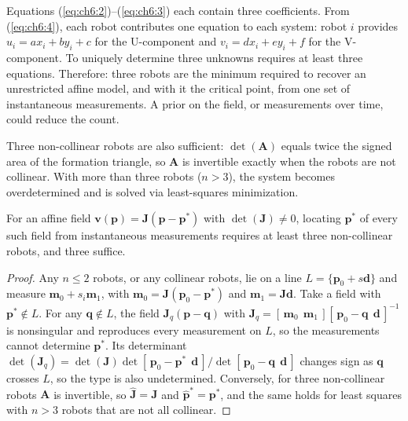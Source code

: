 Equations (\ref{eq:ch6:2})--(\ref{eq:ch6:3}) each contain three coefficients. From (\ref{eq:ch6:4}), each robot contributes one equation to each system: robot $i$ provides $u_i = ax_i + by_i + c$ for the U-component and $v_i = dx_i + ey_i + f$ for the V-component. To uniquely determine three unknowns requires at least three equations. Therefore: three robots are the minimum required to recover an unrestricted affine model, and with it the critical point, from one set of instantaneous measurements. A prior on the field, or measurements over time, could reduce the count.


Three non-collinear robots are also sufficient: $\det(\mathbf{A})$ equals twice the signed area of the formation triangle, so $\mathbf{A}$ is invertible exactly when the robots are not collinear. With more than three robots ($n > 3$), the system becomes overdetermined and is solved via least-squares minimization.

\begin{proposition}[Minimality]\label{prop:min}
For an affine field $\mathbf{v}(\mathbf{p}) = \mathbf{J}(\mathbf{p}-\mathbf{p}^*)$ with $\det(\mathbf{J}) \neq 0$, locating $\mathbf{p}^*$ of every such field from instantaneous measurements requires at least three non-collinear robots, and three suffice.
\end{proposition}

\begin{proof}
Any $n \le 2$ robots, or any collinear robots, lie on a line $L = \{\mathbf{p}_0 + s\mathbf{d}\}$ and measure $\mathbf{m}_0 + s_i\mathbf{m}_1$, with $\mathbf{m}_0 = \mathbf{J}(\mathbf{p}_0 - \mathbf{p}^*)$ and $\mathbf{m}_1 = \mathbf{J}\mathbf{d}$. Take a field with $\mathbf{p}^* \notin L$. For any $\mathbf{q} \notin L$, the field $\mathbf{J}_q(\mathbf{p} - \mathbf{q})$ with $\mathbf{J}_q = [\,\mathbf{m}_0\ \ \mathbf{m}_1\,][\,\mathbf{p}_0 - \mathbf{q}\ \ \mathbf{d}\,]^{-1}$ is nonsingular and reproduces every measurement on $L$, so the measurements cannot determine $\mathbf{p}^*$. Its determinant $\det(\mathbf{J}_q) = \det(\mathbf{J})\det[\,\mathbf{p}_0 - \mathbf{p}^*\ \ \mathbf{d}\,]/\det[\,\mathbf{p}_0 - \mathbf{q}\ \ \mathbf{d}\,]$ changes sign as $\mathbf{q}$ crosses $L$, so the type is also undetermined. Conversely, for three non-collinear robots $\mathbf{A}$ is invertible, so $\hat{\mathbf{J}} = \mathbf{J}$ and $\hat{\mathbf{p}}^* = \mathbf{p}^*$, and the same holds for least squares with $n > 3$ robots that are not all collinear.
\end{proof}

